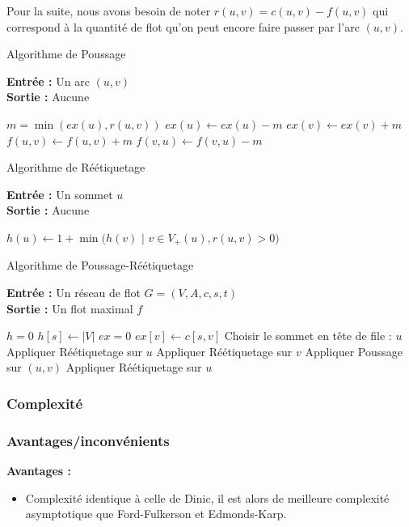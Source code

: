 \documentclass[a4paper]{article}
\begin{document}
Pour la suite, nous avons besoin de noter $r(u,v)=c(u,v)-f(u,v)$ qui correspond à la quantité de flot qu'on peut encore faire passer par l'arc $(u,v)$.\\
\begin{algorithm}[H]
	\caption{Algorithme de Poussage}
	\textbf{Entrée :} Un arc $(u,v)$ \\
	\textbf{Sortie :} Aucune
	\begin{algorithmic}[1]
		\State $m = \min(ex(u), r(u,v))$
		\State $ex(u) \gets ex(u) - m$
		\State $ex(v) \gets ex(v) + m$
		\State $f(u,v) \gets f(u,v) + m$
		\State $f(v,u) \gets f(v,u) - m$
	\end{algorithmic}
\end{algorithm}

\begin{algorithm}[H]
	\caption{Algorithme de Réétiquetage}
	\textbf{Entrée :} Un sommet $u$ \\
	\textbf{Sortie :} Aucune
	\begin{algorithmic}[1]
		\State $h(u) \gets 1 + \min(h(v)$ $|$ $v \in V_+(u), r(u,v)>0 )$
	\end{algorithmic}
\end{algorithm}

\begin{algorithm}[H]
	\caption{Algorithme de Poussage-Réétiquetage}
	\textbf{Entrée :} Un réseau de flot $G = (V, A, c, s, t)$ \\
	\textbf{Sortie :} Un flot maximal $f$
	\begin{algorithmic}[1]
		\State $h = ${$0 $}
		\State $h[s] \gets |V|$
		\State $ex = ${$0 $}
			\State $ex[v] \gets c[s,v]$
		\EndFor
			\State Choisir le sommet en tête de file : $u$
			\State Appliquer Réétiquetage sur $u$
				\State Appliquer Réétiquetage sur $v$
					\State Appliquer Poussage sur $(u,v)$
				\EndIf
			\EndFor
			\State Appliquer Réétiquetage sur $u$
		\EndWhile
		
	\end{algorithmic}
\end{algorithm}

\subsubsection{Complexité}

\subsubsection{Avantages/inconvénients}
\textbf{Avantages :}
\begin{itemize}
	\item Complexité identique à celle de Dinic, il est alors de meilleure complexité asymptotique que Ford-Fulkerson et Edmonds-Karp.
\end{itemize}
\end{document}
